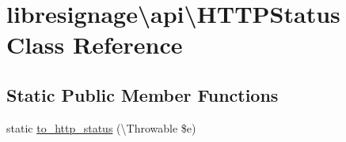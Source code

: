 \hypertarget{classlibresignage_1_1api_1_1HTTPStatus}{}\section{libresignage\textbackslash{}api\textbackslash{}H\+T\+T\+P\+Status Class Reference}
\label{classlibresignage_1_1api_1_1HTTPStatus}
\subsection*{Static Public Member Functions}
\begin{DoxyCompactItemize}
\item 
static \hyperlink{classlibresignage_1_1api_1_1HTTPStatus_accedfb8d947fa4ab52f5f841b0a1d86d}{to\+\_\+http\+\_\+status} (\textbackslash{}Throwable \$e)
\end{DoxyCompactItemize}
